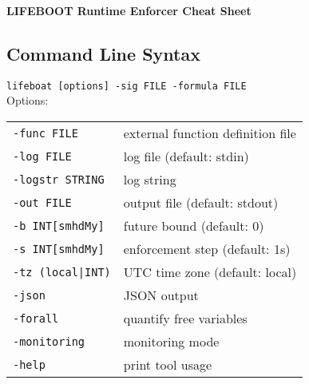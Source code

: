 \documentclass[a4paper,9pt]{extarticle}
\begin{document}
\begin{center}
    {\Large \textbf{LIFEBOOT Runtime Enforcer Cheat Sheet}}
\end{center}

\vspace{0.5em}

\begin{multicols}{2}

\section{Command Line Syntax}
\begin{tcolorbox}
  \texttt{lifeboat [options] -sig FILE -formula FILE}
\\[10pt]
  Options:\\
  \begin{tabular}{ll}
    \texttt{-func FILE} & external function definition file \\
    \texttt{-log FILE} & log file (default: stdin) \\
    \texttt{-logstr STRING} & log string \\
    \texttt{-out FILE} & output file (default: stdout) \\
    \texttt{-b INT[smhdMy]} & future bound (default: 0) \\
    \texttt{-s INT[smhdMy]} & enforcement step (default: 1s) \\
    \texttt{-tz (local|INT)} & UTC time zone (default: local) \\
    \texttt{-json} & JSON output \\
    \texttt{-forall} & quantify free variables \\
    \texttt{-monitoring} & monitoring mode \\
    \texttt{-help} & print tool usage \\
  \end{tabular}
\end{tcolorbox}


\end{multicols}
\end{document}
